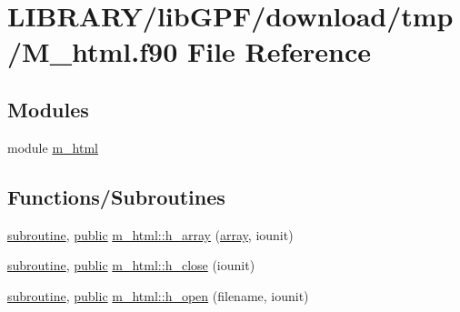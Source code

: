 \hypertarget{M__html_8f90}{}\section{L\+I\+B\+R\+A\+R\+Y/lib\+G\+P\+F/download/tmp/\+M\+\_\+html.f90 File Reference}
\label{M__html_8f90}
\subsection*{Modules}
\begin{DoxyCompactItemize}
\item 
module \hyperlink{namespacem__html}{m\+\_\+html}
\end{DoxyCompactItemize}
\subsection*{Functions/\+Subroutines}
\begin{DoxyCompactItemize}
\item 
\hyperlink{M__stopwatch_83_8txt_acfbcff50169d691ff02d4a123ed70482}{subroutine}, \hyperlink{M__stopwatch_83_8txt_a2f74811300c361e53b430611a7d1769f}{public} \hyperlink{namespacem__html_ad97e98e7241f29c59740757fecd5e6ce}{m\+\_\+html\+::h\+\_\+array} (\hyperlink{intro__blas1_83_8txt_a89db1945e1a335ab0184c6a097821e32}{array}, iounit)
\item 
\hyperlink{M__stopwatch_83_8txt_acfbcff50169d691ff02d4a123ed70482}{subroutine}, \hyperlink{M__stopwatch_83_8txt_a2f74811300c361e53b430611a7d1769f}{public} \hyperlink{namespacem__html_a3c7065739f09d91dd595f97ebb21583d}{m\+\_\+html\+::h\+\_\+close} (iounit)
\item 
\hyperlink{M__stopwatch_83_8txt_acfbcff50169d691ff02d4a123ed70482}{subroutine}, \hyperlink{M__stopwatch_83_8txt_a2f74811300c361e53b430611a7d1769f}{public} \hyperlink{namespacem__html_a2188f9871e716a7812d2ab9fb91fde40}{m\+\_\+html\+::h\+\_\+open} (filename, iounit)
\end{DoxyCompactItemize}
